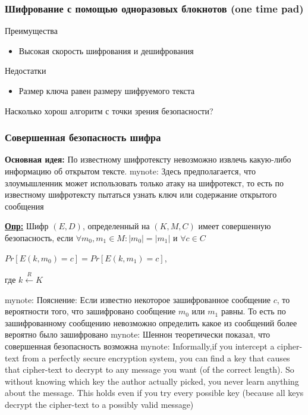 \documentclass{beamer}
\newcommand{\longdef}[1]{{\textbf{\underline{Опр:}} #1}}
\newcommand{\mynote}[1]{mynote: #1}
\newcommand{\mynote}[1]{}
\begin{document}
\begin{frame}
  \frametitle{Шифрование с помощью одноразовых блокнотов (one time pad)}

  \begin{block} {Преимущества}
    \begin{itemize}
      \item{Высокая скорость шифрования и дешифрования}
    \end{itemize}
  \end{block}

  \begin{block} {Недостатки}
    \begin{itemize}
      \item{Размер ключа равен размеру шифруемого текста}
    \end{itemize}
  \end{block}

  \vspace{2 em}
  Насколько хорош алгоритм с точки зрения безопасности?

\end{frame}


\begin{frame}
  \frametitle{Совершенная безопасность шифра}

  \textbf{Основная идея:} По известному шифротексту невозможно извлечь какую-либо информацию об открытом тексте.
  \mynote{Здесь предполагается, что злоумышленник может использовать только атаку
  на шифротекст, то есть по известному шифротексту пытаться узнать ключ или
  содержание открытого сообщения}
  \vspace{2em}

  \longdef{Шифр $(E,D)$, определенный на $(K,M,C)$ имеет совершенную безопасность, если \newline
    $\forall m_{0},m_{1} \in M:  |m_{0}| = |m_{1}|$ и $\forall c \in C$
      \begin{center} $Pr[E(k,m_{0}) = c] = Pr[E(k,m_{1}) = c]$, \end{center}
      где $k \stackrel{R}{\longleftarrow}K$}

  \mynote{Пояснение: Если известно некоторое зашифрованное сообщение $c$, то
    вероятности того, что зашифровано сообщение $m_{0}$ или $m_{1}$ равны. То
    есть по зашифрованному сообщению невозможно определить какое из сообщений
    более вероятно было зашифровано}
  \mynote{Шеннон теоретически показал, что совершенная безопасность возможна}
  \mynote{Informally,if you intercept a cipher-text from a perfectly secure
    encryption system, you can find a key that causes that cipher-text to
    decrypt to any message you want (of the correct length). So without
    knowing which key the author actually picked, you never learn anything
    about the message. This holds even if you try every possible key (because
    all keys decrypt the cipher-text to a possibly valid message)}

\end{frame}
\end{document}
